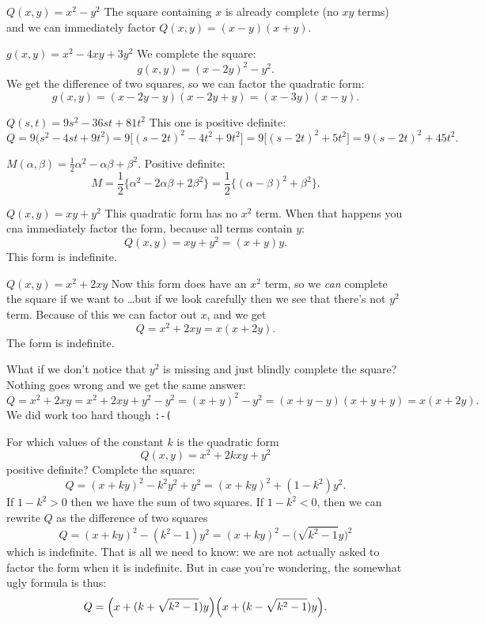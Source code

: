 \begin{multicols}{2}
\subprob $Q(x, y) = x^2-y^2$
\answer
The square containing $x$ is already complete (no $xy$ terms) and we can immediately
factor $Q(x, y) = (x-y)(x+y)$.
\endanswer

\subprob $g(x, y) = x^2-4xy + 3y^2$
\answer
We complete the square:
\[
  g(x, y) = (x-2y)^2 - y^2.
\]
We get the difference of two squares, so we can factor the quadratic form:
\[
  g(x, y) = (x-2y - y) (x-2y + y) = (x-3y)(x-y).
\]
\endanswer

\subprob $Q(s,t) = 9s^2-36st + 81t^2$
\answer
This one is positive definite:
\[
  Q 
  = 9\bigl( s^2 - 4st + 9 t^2\bigr)
  = 9\bigl[ (s - 2t)^2 -4t^2 + 9 t^2\bigr]
  = 9\bigl[ (s - 2t)^2 + 5 t^2\bigr]
  =9(s-2t)^2 + 45 t^2.
\]
\endanswer

\subprob $M(\alpha, \beta) = \frac12 \alpha^2 - \alpha\beta+\beta^2$.
\answer
Positive definite:
\[
  M = \frac12\bigl\{\alpha^2- 2\alpha\beta + 2\beta^2\bigr\}
  =\frac12 \bigl\{(\alpha-\beta)^2 + \beta^2\bigr\}.
\]
\endanswer

\subprob $Q(x,y) = xy+y^2$
\answer
This quadratic form has no $x^2$ term.  When that happens you cna immediately factor
the form, because all terms contain $y$:
\[
Q(x,y) = xy+y^2 = (x+y)y.
\]
This form is indefinite.
\endanswer

\subprob $Q(x, y) = x^2+2xy$
\answer
Now this form does have an $x^2$ term, so we \textit{can} complete the square if we
want to \dots but if we look carefully then we see that there's not $y^2$ term.
Because of this we can factor out $x$, and we get
\[
  Q = x^2+2xy = x(x+2y).
\]
The form is indefinite.

What if we don't notice that $y^2$ is missing and just blindly complete the square?
Nothing goes wrong and we get the same answer:
\[
  Q = x^2+2xy = x^2+ 2xy +y^2 - y^2 = (x+y)^2 - y^2 = (x+y - y)(x+y+y) = x(x+2y).
\]
We did work too hard though \verb|:-(|
\endanswer

\problem  For which values of the constant $k$ is the quadratic form
\[
  Q(x, y) = x^2 + 2kxy + y^2
\]
positive definite?
\answer
Complete the square:
\[
  Q=(x+ky)^2 - k^2 y^2 + y^2
   =(x+ky)^2 + (1- k^2) y^2.
\]
If $1-k^2>0$ then we have the sum of two squares.  If $1-k^2<0$, then we can rewrite
$Q$ as the difference of two squares
\[
   Q=(x+ky)^2 - (k^2-1) y^2
   =(x+ky)^2 - \bigl(\sqrt{k^2-1}y\bigr)^2
\]
which is indefinite.  That is all we need to know: we are not actually asked to
factor the form when it is indefinite.  But in case you're wondering, the somewhat
ugly formula is thus:
\[
  Q = \Bigl(x+(k+\sqrt{k^2-1}) y\Bigr) \Bigl(x+(k-\sqrt{k^2-1}) y\Bigr).
\]


\end{multicols}
